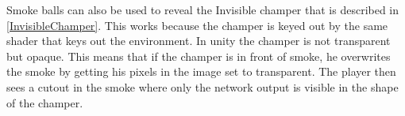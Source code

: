 Smoke balls can also be used to reveal the Invisible champer that is described in \cref{InvisibleChamper}. This works because the champer is keyed out by the same shader that keys out the environment. In unity the champer is not transparent but opaque. This means that if the champer is in front of smoke, he overwrites the smoke by getting his pixels in the image set to transparent. The player then sees a cutout in the smoke where only the network output is visible in the shape of the champer.
